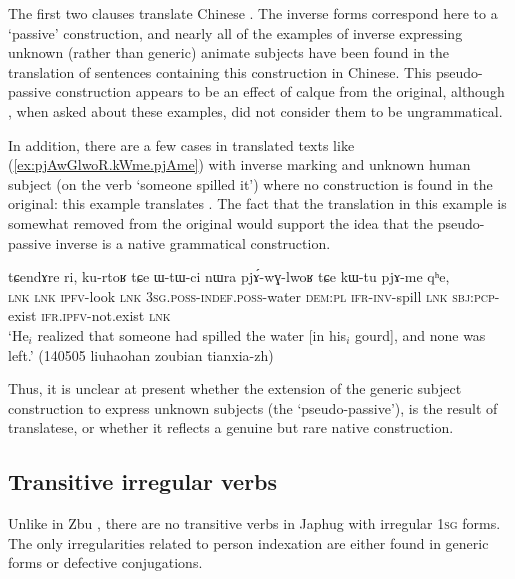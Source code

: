 The first two clauses translate Chinese . The inverse forms correspond here to a   `passive' construction, and nearly all of the examples of inverse expressing unknown (rather than generic) animate subjects have been found in the translation of sentences containing this construction in Chinese. This pseudo-passive construction appears to be an effect of calque from the original, although , when asked about these examples, did not consider them to be ungrammatical. 

In addition, there are a few cases in translated texts like (\ref{ex:pjAwGlwoR.kWme.pjAme}) with inverse marking and unknown human subject (on the verb  `someone spilled it') where no   construction is found in the original: this example translates . The fact that the translation in this example is somewhat removed from the original would support the idea that the pseudo-passive inverse is a native grammatical construction.
 
\begin{exe}
\ex \label{ex:pjAwGlwoR.kWme.pjAme}
\gll  tɕendɤre ri, ku-rtoʁ tɕe ɯ-tɯ-ci nɯra pjɤ́-wɣ-lwoʁ tɕe kɯ-tu pjɤ-me qʰe,  \\
\textsc{lnk} \textsc{lnk} \textsc{ipfv}-look \textsc{lnk} \textsc{3sg}.\textsc{poss}-\textsc{indef}.\textsc{poss}-water \textsc{dem}:\textsc{pl} \textsc{ifr}-\textsc{inv}-spill \textsc{lnk} \textsc{sbj}:\textsc{pcp}-exist \textsc{ifr}.\textsc{ipfv}-not.exist \textsc{lnk} \\
\glt `He$_i$ realized that someone had spilled the water [in his$_i$ gourd], and none was left.' (140505 liuhaohan zoubian tianxia-zh)
\end{exe}

Thus, it is unclear at present whether the extension of the generic subject construction to express unknown subjects (the `pseudo-passive'), is the result of translatese, or whether it reflects a genuine but rare native construction.

\subsection{Transitive irregular verbs} \label{sec:irregular.transitive}
  
Unlike in Zbu \citep{gongxun14agreement}, there are no transitive verbs in Japhug with irregular \textsc{1sg} forms. The only irregularities related to person indexation are either found in generic forms or defective conjugations.

